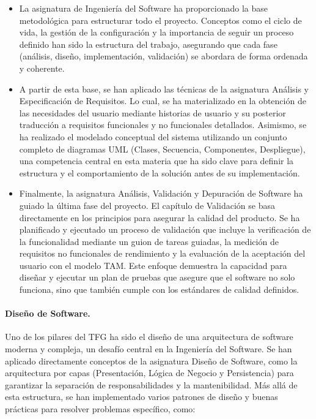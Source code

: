 \begin{itemize}
\item La asignatura de Ingeniería del Software ha proporcionado la base metodológica para estructurar todo el proyecto. Conceptos como el ciclo de vida, la gestión de la configuración y la importancia de seguir un proceso definido han sido la estructura del trabajo, asegurando que cada fase (análisis, diseño, implementación, validación) se abordara de forma ordenada y coherente.

\item A partir de esta base, se han aplicado las técnicas de la asignatura Análisis y Especificación de Requisitos. Lo cual, se ha materializado en la obtención de las necesidades del usuario mediante historias de usuario y su posterior traducción a requisitos funcionales y no funcionales detallados. Asimismo, se ha realizado el modelado conceptual del sistema utilizando un conjunto completo de diagramas UML (Clases, Secuencia, Componentes, Despliegue), una competencia central en esta materia que ha sido clave para definir la estructura y el comportamiento de la solución antes de su implementación.

\item Finalmente, la asignatura Análisis, Validación y Depuración de Software ha guiado la última fase del proyecto. El capítulo de Validación se basa directamente en los principios para asegurar la calidad del producto. Se ha planificado y ejecutado un proceso de validación que incluye la verificación de la funcionalidad mediante un guion de tareas guiadas, la medición de requisitos no funcionales de rendimiento y la evaluación de la aceptación del usuario con el modelo TAM. Este enfoque demuestra la capacidad para diseñar y ejecutar un plan de pruebas que asegure que el software no solo funciona, sino que también cumple con los estándares de calidad definidos.

\end{itemize}

\paragraph{Diseño de Software.}
Uno de los pilares del TFG ha sido el diseño de una arquitectura de software moderna y compleja, un desafío central en la Ingeniería del Software. Se han aplicado directamente conceptos de la asignatura Diseño de Software, como la arquitectura por capas (Presentación, Lógica de Negocio y Persistencia) para garantizar la separación de responsabilidades y la mantenibilidad. 
Más allá de esta estructura, se han implementado varios patrones de diseño y buenas prácticas para resolver problemas específico, como: 

